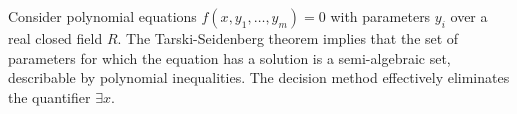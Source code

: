 Consider polynomial equations $f(x, y_1, \ldots, y_m) = 0$ with parameters $y_i$ over a real closed field $R$. The Tarski-Seidenberg theorem implies that the set of parameters for which the equation has a solution is a semi-algebraic set, describable by polynomial inequalities. The decision method effectively eliminates the quantifier $\exists x$.
